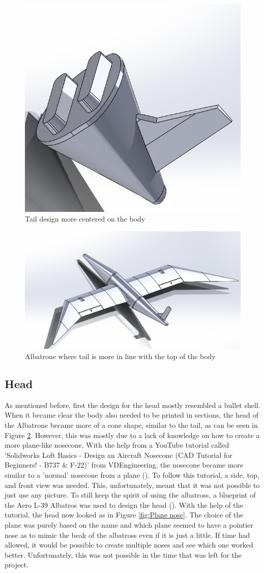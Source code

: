 \begin{figure}
    \centering
    \includegraphics[width=0.5\linewidth]{images/Tail v1.png}
    \caption{Tail design more centered on the body}
    \label{fig:Tail v1}
\end{figure}

\begin{figure}
    \centering
    \includegraphics[width=0.5\linewidth]{images/Albatrone small body.png}
    \caption{Albatrone where tail is more in line with the top of the body}
    \label{fig:Albatrone small body}
\end{figure}

\subsection{Head} 
As mentioned before, first the design for the head mostly resembled a bullet shell. When it became clear the body also needed to be printed in sections, the head of the Albatrone became more of a cone shape, similar to the tail, as can be seen in Figure \ref{fig:Albatrone small body}. However, this was mostly due to a lack of knowledge on how to create a more plane-like nosecone, With the help from a YouTube tutorial called 'Solidworks Loft Basics - Design an Aircraft Nosecone (CAD Tutorial for Beginners! - B737 \& F-22)' from VDEngineering, the nosecone became more similar to a 'normal' nosecone from a plane (\cite{Nosecone}). To follow this tutorial, a side, top, and front view was needed. This, unfortunately, meant that it was not possible to just use any picture. To still keep the spirit of using the albatross, a blueprint of the Aero L-39 Albatros was used to design the head (\cite{DrawingNC}). With the help of the tutorial, the head now looked as in Figure \ref{fig:Plane nose}. The choice of the plane was purely based on the name and which plane seemed to have a pointier nose as to mimic the beak of the albatross even if it is just a little. If time had allowed, it would be possible to create multiple noses and see which one worked better. Unfortunately, this was not possible in the time that was left for the project.\\

